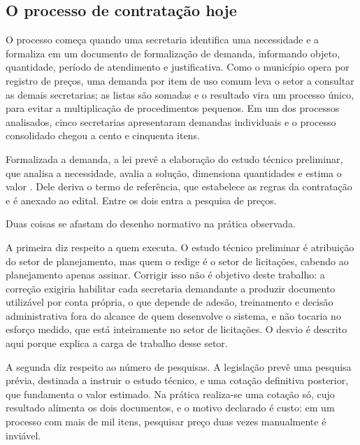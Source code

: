 
\subsection{O processo de contratação hoje}
\label{subsec:processo-hoje}

O processo começa quando uma secretaria identifica uma necessidade e a formaliza
em um documento de formalização de demanda, informando objeto, quantidade,
período de atendimento e justificativa. Como o município opera por registro de
preços, uma demanda por item de uso comum leva o setor a consultar as demais
secretarias; as listas são somadas e o resultado vira um processo único, para
evitar a multiplicação de procedimentos pequenos. Em um dos processos
analisados, cinco secretarias apresentaram demandas individuais e o processo
consolidado chegou a cento e cinquenta itens.

Formalizada a demanda, a lei prevê a elaboração do estudo técnico preliminar,
que analisa a necessidade, avalia a solução, dimensiona quantidades e estima o
valor \cite{brasil2021lei14133}. Dele deriva o termo de referência, que
estabelece as regras da contratação e é anexado ao edital. Entre os dois entra a
pesquisa de preços.

Duas coisas se afastam do desenho normativo na prática observada.

A primeira diz respeito a quem executa. O estudo técnico preliminar é atribuição
do setor de planejamento, mas quem o redige é o setor de licitações, cabendo ao
planejamento apenas assinar. Corrigir isso não é objetivo deste trabalho: a
correção exigiria habilitar cada secretaria demandante a produzir documento
utilizável por conta própria, o que depende de adesão, treinamento e decisão
administrativa fora do alcance de quem desenvolve o sistema, e não tocaria no
esforço medido, que está inteiramente no setor de licitações. O desvio é
descrito aqui porque explica a carga de trabalho desse setor.

A segunda diz respeito ao número de pesquisas. A legislação prevê uma pesquisa
prévia, destinada a instruir o estudo técnico, e uma cotação definitiva
posterior, que fundamenta o valor estimado. Na prática realiza-se uma cotação
só, cujo resultado alimenta os dois documentos, e o motivo declarado é custo: em
um processo com mais de mil itens, pesquisar preço duas vezes manualmente é
inviável.

